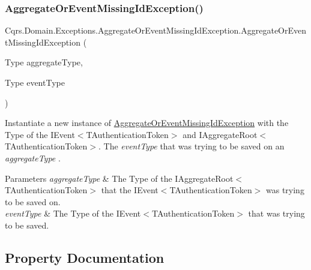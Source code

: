 \subsubsection{\texorpdfstring{Aggregate\+Or\+Event\+Missing\+Id\+Exception()}{AggregateOrEventMissingIdException()}}
{\footnotesize\ttfamily Cqrs.\+Domain.\+Exceptions.\+Aggregate\+Or\+Event\+Missing\+Id\+Exception.\+Aggregate\+Or\+Event\+Missing\+Id\+Exception (\begin{DoxyParamCaption}\item[{Type}]{aggregate\+Type,  }\item[{Type}]{event\+Type }\end{DoxyParamCaption})}



Instantiate a new instance of \hyperlink{classCqrs_1_1Domain_1_1Exceptions_1_1AggregateOrEventMissingIdException}{Aggregate\+Or\+Event\+Missing\+Id\+Exception} with the Type of the I\+Event$<$\+T\+Authentication\+Token$>$ and I\+Aggregate\+Root$<$\+T\+Authentication\+Token$>$. The {\itshape event\+Type}  that was trying to be saved on an {\itshape aggregate\+Type} . 


\begin{DoxyParams}{Parameters}
{\em aggregate\+Type} & The Type of the I\+Aggregate\+Root$<$\+T\+Authentication\+Token$>$ that the I\+Event$<$\+T\+Authentication\+Token$>$ was trying to be saved on.\\
\hline
{\em event\+Type} & The Type of the I\+Event$<$\+T\+Authentication\+Token$>$ that was trying to be saved.\\
\hline
\end{DoxyParams}


\subsection{Property Documentation}
\mbox{\label{classCqrs_1_1Domain_1_1Exceptions_1_1AggregateOrEventMissingIdException_a05dd2bfa86d067aca316a7d880dc3c18_a05dd2bfa86d067aca316a7d880dc3c18}} 
